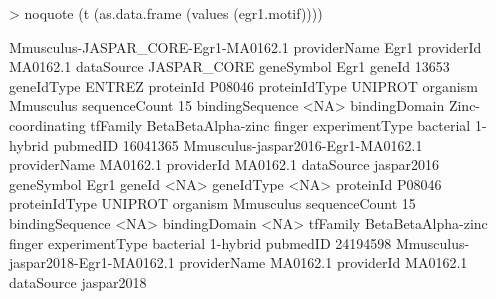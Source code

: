 \documentclass{article}
\renewenvironment{Schunk}{\vspace{\topsep}}{\vspace{\topsep}}
\begin{document}
\begin{Schunk}
\begin{Sinput}
> noquote (t (as.data.frame (values (egr1.motif))))
\end{Sinput}
\begin{Soutput}
                Mmusculus-JASPAR_CORE-Egr1-MA0162.1
providerName    Egr1                               
providerId      MA0162.1                           
dataSource      JASPAR_CORE                        
geneSymbol      Egr1                               
geneId          13653                              
geneIdType      ENTREZ                             
proteinId       P08046                             
proteinIdType   UNIPROT                            
organism        Mmusculus                          
sequenceCount   15                                 
bindingSequence <NA>                               
bindingDomain   Zinc-coordinating                  
tfFamily        BetaBetaAlpha-zinc finger          
experimentType  bacterial 1-hybrid                 
pubmedID        16041365                           
                Mmusculus-jaspar2016-Egr1-MA0162.1
providerName    MA0162.1                          
providerId      MA0162.1                          
dataSource      jaspar2016                        
geneSymbol      Egr1                              
geneId          <NA>                              
geneIdType      <NA>                              
proteinId       P08046                            
proteinIdType   UNIPROT                           
organism        Mmusculus                         
sequenceCount   15                                
bindingSequence <NA>                              
bindingDomain   <NA>                              
tfFamily        BetaBetaAlpha-zinc finger         
experimentType  bacterial 1-hybrid                
pubmedID        24194598                          
                Mmusculus-jaspar2018-Egr1-MA0162.1        
providerName    MA0162.1                                  
providerId      MA0162.1                                  
dataSource      jaspar2018                                

\end{Soutput}
\end{Schunk}
\end{document}

